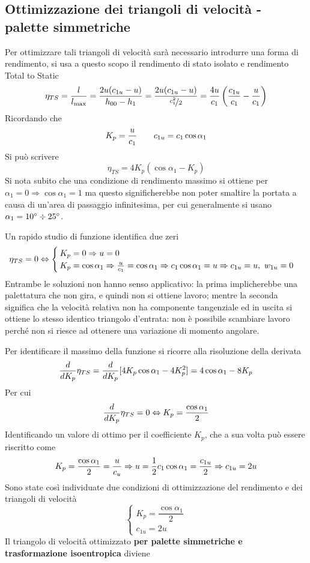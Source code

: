 \documentclass[a4paper, 15pt]{article}
\begin{document}
\subsection{Ottimizzazione dei triangoli di velocità - palette simmetriche}
\begin{adjustwidth}{2in}{}
	Per ottimizzare tali triangoli di velocità sarà necessario introdurre una forma di rendimento, si usa a questo scopo il rendimento di stato isolato e rendimento Total to Static
	\[\eta_{TS}={l\over l_{\max}} = \dfrac{2u(c_{1u}-u)}{h_{00}-h_1} = \dfrac{2u(c_{1u}-u)}{\nicefrac{c_1^2}{2}} = {4u\over c_1}\left({c_{1u}\over c_1}-{u\over c_1}\right)\]
	Ricordando che
	\[K_p = {u\over c_1}\qquad c_{1u} = c_1\cos\alpha_1 \]
	Si può scrivere
	\[\eta_{TS}=4K_p(\cos\alpha_1-K_p)\]
	Si nota subito che una condizione di rendimento massimo si ottiene per $\alpha_1=0\Rightarrow\cos\alpha_1=1$ ma questo significherebbe non poter smaltire la portata a causa di un'area di passaggio infinitesima, per cui generalmente si usano $\alpha_1 = 10\degree\div25\degree$. \newline 
	
	Un rapido studio di funzione identifica due zeri
	\[\eta_{TS} = 0 \Leftrightarrow \begin{cases}
		K_p = 0 \Rightarrow u = 0 \\
		K_p = \cos\alpha_1 \Rightarrow {u\over c_1} = \cos\alpha_1 \Rightarrow c_1\cos\alpha_1 = u \Rightarrow c_{1u} = u, ~ w_{1u} = 0
	\end{cases}\]
	Entrambe le soluzioni non hanno senso applicativo: la prima implicherebbe una palettatura che non gira, e quindi non si ottiene lavoro; mentre la seconda significa che la velocità relativa non ha componente tangenziale ed in uscita si ottiene lo stesso identico triangolo d'entrata: non è possibile scambiare lavoro perché non si riesce ad ottenere una variazione di momento angolare. \newline 
	
	Per identificare il massimo della funzione si ricorre alla risoluzione della derivata
	\[{d\over dK_p}\eta_{TS} = {d\over dK_p}[4K_p\cos\alpha_1-4K_p^2] = 4\cos\alpha_1-8K_p\]
	Per cui
	\[{d\over dK_p}\eta_{TS} = 0 \Leftrightarrow K_p = \dfrac{\cos\alpha_1}{2}\]
	Identificando un valore di ottimo per il coefficiente $K_p$, che a sua volta può essere riscritto come
	\[K_p = \dfrac{\cos\alpha_1}{2} = {u\over c_u} \Rightarrow u = {1\over2}c_1\cos\alpha_1 = {c_{1u}\over2} \Rightarrow c_{1u} = 2u\]
	Sono state così individuate due condizioni di ottimizzazione del rendimento e dei triangoli di velocità
	\begin{equation}\label{eq:15}
		\boxed{\begin{cases}
				K_p = \dfrac{\cos\alpha_1}{2}\\
				c_{1u} = 2u
		\end{cases}}
	\end{equation}
	Il triangolo di velocità ottimizzato \textbf{per palette simmetriche e trasformazione isoentropica} diviene
\end{adjustwidth}	
\end{document}
